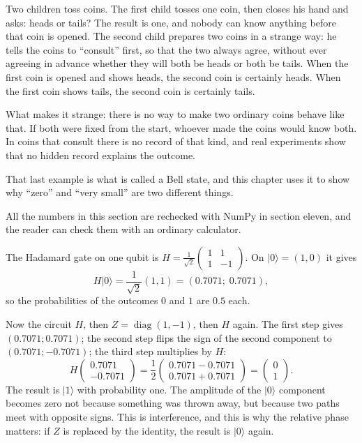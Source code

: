 \begin{untukanak}
Two children toss coins. The first child tosses one coin, then closes his hand and asks:
heads or tails? The result is one, and nobody can know anything before that coin is
opened. The second child prepares two coins in a strange way: he tells the coins to
``consult'' first, so that the two always agree, without ever agreeing in advance whether
they will both be heads or both be tails. When the first coin is opened and shows heads,
the second coin is certainly heads. When the first coin shows tails, the second coin is
certainly tails.

What makes it strange: there is no way to make two ordinary coins behave like that. If
both were fixed from the start, whoever made the coins would know both. In coins that
consult there is no record of that kind, and real experiments show that no hidden record
explains the outcome.

That last example is what is called a Bell state, and this chapter uses it to show why
``zero'' and ``very small'' are two different things.
\end{untukanak}

All the numbers in this section are rechecked with NumPy in section eleven, and the reader
can check them with an ordinary calculator.

The Hadamard gate on one qubit is
$H=\frac{1}{\sqrt{2}}\begin{pmatrix}1&1\\1&-1\end{pmatrix}$. On $|0\rangle=(1,0)$ it gives
\[
H|0\rangle=\frac{1}{\sqrt{2}}(1,1)=(0.7071;\;0.7071),
\]
so the probabilities of the outcomes $0$ and $1$ are $0.5$ each.

Now the circuit $H$, then $Z=\operatorname{diag}(1,-1)$, then $H$ again. The first step
gives $(0.7071;0.7071)$; the second step flips the sign of the second component to
$(0.7071;-0.7071)$; the third step multiplies by $H$:
\[
H\begin{pmatrix}0.7071\\-0.7071\end{pmatrix}
=\frac{1}{2}\begin{pmatrix}0.7071-0.7071\\0.7071+0.7071\end{pmatrix}
=\begin{pmatrix}0\\1\end{pmatrix}.
\]
The result is $|1\rangle$ with probability one. The amplitude of the $|0\rangle$ component
becomes zero not because something was thrown away, but because two paths meet with
opposite signs. This is interference, and this is why the relative phase matters: if $Z$
is replaced by the identity, the result is $|0\rangle$ again.

